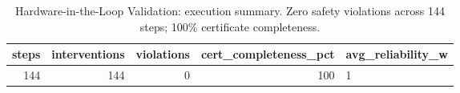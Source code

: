 \begin{table}[htbp]
\centering
\caption{Hardware-in-the-Loop Validation: execution summary.  Zero safety violations across 144 steps; 100\% certificate completeness.}
\label{tab:hil_timing}
\begin{tabular}{rrrrl}
\toprule
steps & interventions & violations & cert\_completeness\_pct & avg\_reliability\_w \\
\midrule
144 & 144 & 0 & 100 & 1 \\
\bottomrule
\end{tabular}
\end{table}